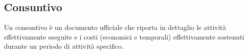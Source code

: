 \subsection{Consuntivo}
    Un consuntivo è un documento ufficiale che riporta in dettaglio le attività effettivamente eseguite e i costi (economici e temporali) effettivamente sostenuti durante un periodo di attività specifico.  
